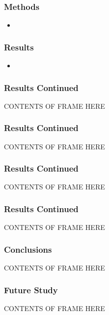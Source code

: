 \documentclass[xcolor=dvipsnames]{beamer}
\begin{document}
\frame
{\frametitle{Methods}
\begin{itemize}
  \item 
\end{itemize}
}

\frame
{\frametitle{Results}
\begin{itemize}
    \item 
\end{itemize}
}

\frame
{\frametitle{Results Continued}
CONTENTS OF FRAME HERE
}

\frame
{\frametitle{Results Continued}
CONTENTS OF FRAME HERE
}

\frame
{\frametitle{Results Continued}
CONTENTS OF FRAME HERE
}

\frame
{\frametitle{Results Continued}
CONTENTS OF FRAME HERE
}

\frame
{\frametitle{Conclusions}
CONTENTS OF FRAME HERE
}


\frame
{\frametitle{Future Study}
CONTENTS OF FRAME HERE
}










\end{document}
